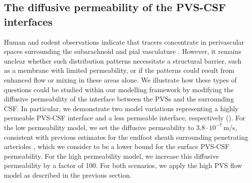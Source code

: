 \documentclass[fleqn,10pt]{wlscirep}
\begin{document}





  

\subsection*{The diffusive permeability of the PVS-CSF interfaces}

Human and rodent observations indicate that tracers concentrate in
perivascular spaces surrounding the subarachnoid and pial vasculature
\cite{zhang1990interrelationships,zhang1992directional,
  bedussi2017paravascular, mestre2018flow, bedussi2018paravascular,
  eide2024functional}. However, it remains unclear whether such
distribution patterns necessitate a structural barrier, such as a
membrane with limited permeability, or if the patterns could result
from enhanced flow or mixing in these areas alone. We illustrate how
these types of questions could be studied within our modelling
framework by modifying the diffusive permeability of the interface
between the PVSs and the surrounding CSF. In particular, we
demonstrate two model variations representing a highly permeable
PVS-CSF interface and a less permeable interface, respectively
(). For the low permeability model, we
set the diffusive permeability to $3.8 \cdot 10^{-7}\,$m/s, consistent
with previous estimates for the endfoot sheath surrounding penetrating
arterioles \cite{koch2023estimates}, which we consider to be a lower
bound for the surface PVS-CSF permeability. For the high permeability
model, we increase this diffusive permeability by a factor of 100. For
both scenarios, we apply the high PVS flow model as described in the
previous section.
\end{document}
